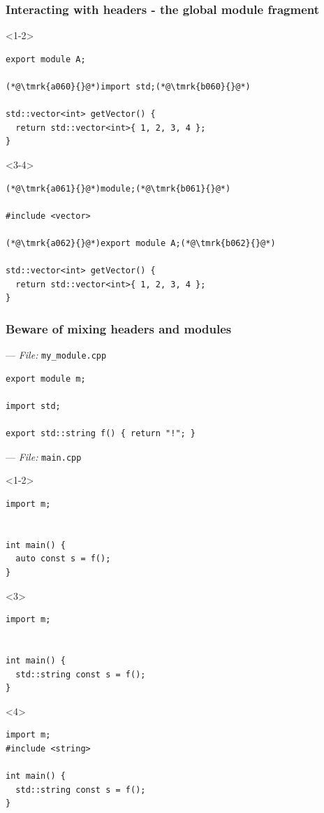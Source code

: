 \documentclass[aspectratio=169]{beamer}
\newif\iftransitions
\newcommand{\cpause}{\iftransitions \pause \fi}
\newcommand{\tmrk}[2]{\tikz[baseline,inner sep=0]\node[anchor=base](#1){#2};}
\begin{document}
\begin{frame}[fragile]
  \frametitle{Interacting with headers - the global module fragment}
  
  \begin{onlyenv}<1-2>
  \begin{lstlisting}[style=cpp20]
export module A;

(*@\tmrk{a060}{}@*)import std;(*@\tmrk{b060}{}@*)

std::vector<int> getVector() {
  return std::vector<int>{ 1, 2, 3, 4 };
}
  \end{lstlisting}
  \end{onlyenv}
  
  
  \begin{onlyenv}<3-4>
  \begin{lstlisting}[style=cpp20]
(*@\tmrk{a061}{}@*)module;(*@\tmrk{b061}{}@*)

#include <vector>

(*@\tmrk{a062}{}@*)export module A;(*@\tmrk{b062}{}@*)

std::vector<int> getVector() {
  return std::vector<int>{ 1, 2, 3, 4 };
}
  \end{lstlisting}
  \end{onlyenv}
\end{frame}

\begin{frame}[fragile]
  \frametitle{Beware of mixing headers and modules}
  --- \textit{File:} \texttt{my\_module.cpp}
  \begin{lstlisting}[style=cpp20]
export module m;

import std;

export std::string f() { return "!"; }
  \end{lstlisting}
  \cpause
  --- \textit{File:} \texttt{main.cpp}
  \begin{onlyenv}<1-2>
  \begin{lstlisting}[style=cpp20]
import m;


int main() {
  auto const s = f();
}
  \end{lstlisting}
  \end{onlyenv}
  \begin{onlyenv}<3>
  \begin{lstlisting}[style=cpp20]
import m;


int main() {
  std::string const s = f();
}
  \end{lstlisting}
  \end{onlyenv}
  \begin{onlyenv}<4>
  \begin{lstlisting}[style=cpp20]
import m;
#include <string>

int main() {
  std::string const s = f();
}
  \end{lstlisting}
  \end{onlyenv}
\end{frame}
\end{document}
